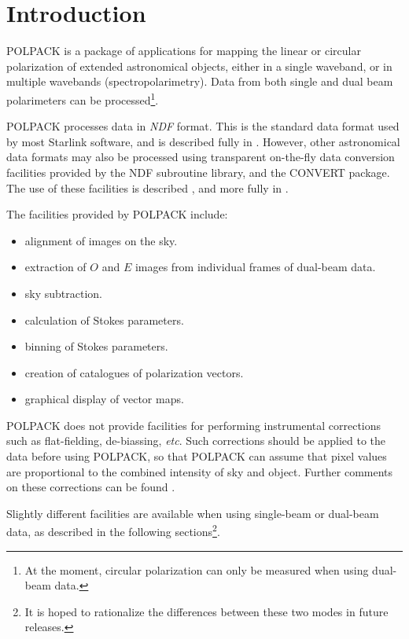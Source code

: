 \documentclass[twoside,11pt]{starlink}
\begin{document}
\scfrontmatter

\section{Introduction}
POLPACK is a package of applications for mapping the linear or circular
polarization of extended astronomical objects, either in a single
waveband, or in multiple wavebands (spectropolarimetry). Data from both
single and dual beam polarimeters can be processed\footnote{At the
moment, circular polarization can only be measured when using dual-beam
data.}.

POLPACK processes data in \emph{NDF} format. This is the standard data
format used by most Starlink software, and is described fully in
. However, other astronomical data formats may also
be processed using transparent on-the-fly data conversion facilities
provided by the NDF subroutine library, and the CONVERT package. The use of
these facilities is described ,
and more fully in .

The facilities provided by POLPACK include:
\begin{itemize}
\item alignment of images on the sky.
\item extraction of $O$ and $E$ images from individual frames of dual-beam
data.
\item sky subtraction.
\item calculation of Stokes parameters.
\item binning of Stokes parameters.
\item creation of catalogues of polarization vectors.
\item graphical display of vector maps.
\end{itemize}

POLPACK does not provide facilities for performing instrumental
corrections such as flat-fielding, de-biassing, \emph{etc}. Such corrections
should be applied to the data before using POLPACK, so that POLPACK can
assume that pixel values are proportional to the combined intensity of
sky and object. Further comments on these corrections can be found
.

Slightly different facilities are available when using single-beam or
dual-beam data, as described in the following sections\footnote{It is
hoped to rationalize the differences between these two modes in future
releases.}.
\end{document}
